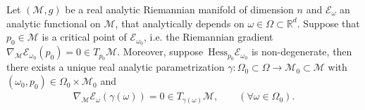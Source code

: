 \documentclass[reqno]{amsart}
\begin{document}
\begin{theorem}\label{IFT}
    Let $(\mathcal{M},g)$ be a real analytic Riemannian manifold of dimension $n$ and $\mathcal{E}_{\omega}$ an analytic functional on $\mathcal{M}$, that analytically depends on $\omega\in \Omega\subset \mathbb{R}^d$. Suppose that $p_0\in \mathcal{M}$ is a critical point of $\mathcal{E}_{\omega_0}$, i.e. the Riemannian gradient $\nabla_\mathcal{M}   \mathcal{E}_{\omega_0}(p_0)=0\in T_{p_0}\mathcal{M}$. Moreover, suppose $\,\mathrm{Hess}_{p_0}\mathcal{E}_{\omega_0}$ is non-degenerate, then there exists a unique real analytic parametrization $\gamma :\Omega_0\subset \Omega\longrightarrow \mathcal{M}_0\subset \mathcal{M}$ with $(\omega_0,p_0)\in \Omega_0\times \mathcal{M}_0$ and
    \begin{align*}
        \nabla_\mathcal{M} \mathcal{E}_{\omega} (\gamma(\omega))=0\in T_{\gamma(\omega)}\mathcal{M}, \qquad (\forall {\omega}\in \Omega_0).
    \end{align*}
\end{theorem}
\end{document}
